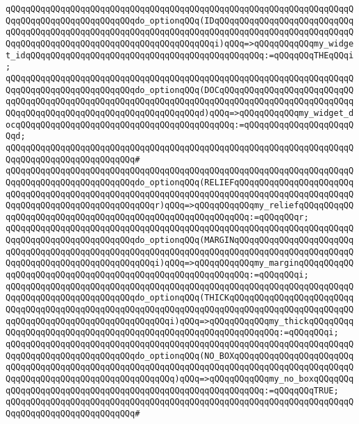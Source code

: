 \verb|qQQqqQQqqQQqqQQqqQQqqQQqqQQqqQQqqQQqqQQqqQQqqQQqqQQqqQQqqQQqqQQqqQQqqQQqqQQqqQQqqQQqqQQqqQQqqQQqdo_optionqQQq(IDqQQqqQQqqQQqqQQqqQQqqQQqqQQqqQQqqQQqqQQqqQQqqQQqqQQqqQQqqQQqqQQqqQQqqQQqqQQqqQQqqQQqqQQqqQQqqQQqqQQqqQQqqQQqqQQqqQQqqQQqqQQqqQQqqQQqqQQqqQQqi)qQQq=>qQQqqQQqqQQqmy_widget_idqQQqqQQqqQQqqQQqqQQqqQQqqQQqqQQqqQQqqQQqqQQqqQQq:=qQQqqQQqTHEqQQqi;|\newline
\verb|qQQqqQQqqQQqqQQqqQQqqQQqqQQqqQQqqQQqqQQqqQQqqQQqqQQqqQQqqQQqqQQqqQQqqQQqqQQqqQQqqQQqqQQqqQQqqQQqdo_optionqQQq(DOCqQQqqQQqqQQqqQQqqQQqqQQqqQQqqQQqqQQqqQQqqQQqqQQqqQQqqQQqqQQqqQQqqQQqqQQqqQQqqQQqqQQqqQQqqQQqqQQqqQQqqQQqqQQqqQQqqQQqqQQqqQQqqQQqqQQqqQQqd)qQQq=>qQQqqQQqqQQqmy_widget_docqQQqqQQqqQQqqQQqqQQqqQQqqQQqqQQqqQQqqQQqqQQq:=qQQqqQQqqQQqqQQqqQQqqQQqd;|\newline
\verb|qQQqqQQqqQQqqQQqqQQqqQQqqQQqqQQqqQQqqQQqqQQqqQQqqQQqqQQqqQQqqQQqqQQqqQQqqQQqqQQqqQQqqQQqqQQqqQQq#|\newline
\verb|qQQqqQQqqQQqqQQqqQQqqQQqqQQqqQQqqQQqqQQqqQQqqQQqqQQqqQQqqQQqqQQqqQQqqQQqqQQqqQQqqQQqqQQqqQQqqQQqdo_optionqQQq(RELIEFqQQqqQQqqQQqqQQqqQQqqQQqqQQqqQQqqQQqqQQqqQQqqQQqqQQqqQQqqQQqqQQqqQQqqQQqqQQqqQQqqQQqqQQqqQQqqQQqqQQqqQQqqQQqqQQqqQQqqQQqqQQqr)qQQq=>qQQqqQQqqQQqmy_reliefqQQqqQQqqQQqqQQqqQQqqQQqqQQqqQQqqQQqqQQqqQQqqQQqqQQqqQQqqQQq:=qQQqqQQqr;|\newline
\verb|qQQqqQQqqQQqqQQqqQQqqQQqqQQqqQQqqQQqqQQqqQQqqQQqqQQqqQQqqQQqqQQqqQQqqQQqqQQqqQQqqQQqqQQqqQQqqQQqdo_optionqQQq(MARGINqQQqqQQqqQQqqQQqqQQqqQQqqQQqqQQqqQQqqQQqqQQqqQQqqQQqqQQqqQQqqQQqqQQqqQQqqQQqqQQqqQQqqQQqqQQqqQQqqQQqqQQqqQQqqQQqqQQqqQQqqQQqi)qQQq=>qQQqqQQqqQQqmy_marginqQQqqQQqqQQqqQQqqQQqqQQqqQQqqQQqqQQqqQQqqQQqqQQqqQQqqQQqqQQq:=qQQqqQQqi;|\newline
\verb|qQQqqQQqqQQqqQQqqQQqqQQqqQQqqQQqqQQqqQQqqQQqqQQqqQQqqQQqqQQqqQQqqQQqqQQqqQQqqQQqqQQqqQQqqQQqqQQqdo_optionqQQq(THICKqQQqqQQqqQQqqQQqqQQqqQQqqQQqqQQqqQQqqQQqqQQqqQQqqQQqqQQqqQQqqQQqqQQqqQQqqQQqqQQqqQQqqQQqqQQqqQQqqQQqqQQqqQQqqQQqqQQqqQQqqQQqqQQqi)qQQq=>qQQqqQQqqQQqmy_thickqQQqqQQqqQQqqQQqqQQqqQQqqQQqqQQqqQQqqQQqqQQqqQQqqQQqqQQqqQQqqQQq:=qQQqqQQqi;|\newline
\verb|qQQqqQQqqQQqqQQqqQQqqQQqqQQqqQQqqQQqqQQqqQQqqQQqqQQqqQQqqQQqqQQqqQQqqQQqqQQqqQQqqQQqqQQqqQQqqQQqdo_optionqQQq(NO_BOXqQQqqQQqqQQqqQQqqQQqqQQqqQQqqQQqqQQqqQQqqQQqqQQqqQQqqQQqqQQqqQQqqQQqqQQqqQQqqQQqqQQqqQQqqQQqqQQqqQQqqQQqqQQqqQQqqQQqqQQqqQQqqQQq)qQQq=>qQQqqQQqqQQqmy_no_boxqQQqqQQqqQQqqQQqqQQqqQQqqQQqqQQqqQQqqQQqqQQqqQQqqQQqqQQqqQQq:=qQQqqQQqTRUE;|\newline
\verb|qQQqqQQqqQQqqQQqqQQqqQQqqQQqqQQqqQQqqQQqqQQqqQQqqQQqqQQqqQQqqQQqqQQqqQQqqQQqqQQqqQQqqQQqqQQqqQQq#|\newline
